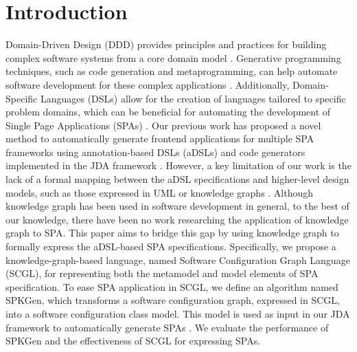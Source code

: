\documentclass[runningheads]{llncs}
\begin{document}
\section{Introduction}

Domain-Driven Design (DDD) provides principles and practices for building complex software systems from a core domain model \cite{evans_domain-driven_2004}. Generative programming techniques, such as code generation and metaprogramming, can help automate software development for these complex applications \cite{czarnecki_generative_2002}. Additionally, Domain-Specific Languages (DSLs) allow for the creation of languages tailored to specific problem domains, which can be beneficial for automating the development of Single Page Applications (SPAs) \cite{fowler_domain-specific_2010}. Our previous work has proposed a novel method to automatically generate frontend applications for multiple SPA frameworks using annotation-based DSLs (aDSLs) and code generators implemented in the JDA framework \cite{le_jdomainapp_2019,le_generating_2022,le_modularly_2024}. However, a key limitation of our work is the lack of a formal mapping between the aDSL specifications and higher-level design models, such as those expressed in UML or knowledge graphs \cite{omg2017uml} \cite{wang_application_2023}. Although knowledge graph has been used in software development in general, to the best of our knowledge, there have been no work researching the application of knowledge graph to SPA. This paper aims to bridge this gap by using knowledge graph to formally express the aDSL-based SPA specifications. Specifically, we propose a  knowledge-graph-based language, named Software Configuration Graph Language (SCGL), for representing both the metamodel and model elements of SPA specification. To ease SPA application in SCGL, we define an algorithm named SPKGen, which transforms a software configuration graph, expressed in SCGL, into a software configuration class model. This model is used as input in our JDA framework to automatically generate SPAs \cite{le_generating_2022,le_modularly_2024}. We evaluate the performance of SPKGen and the effectiveness of SCGL for expressing SPAs.
\end{document}
